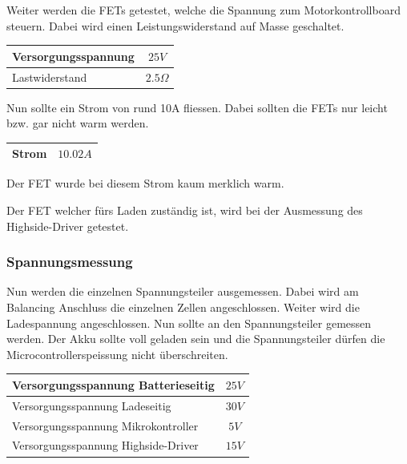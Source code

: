 Weiter werden die FETs getestet, welche die Spannung zum Motorkontrollboard steuern. Dabei wird einen Leistungswiderstand auf Masse geschaltet. 

\begin{center}
	\begin{tabular}{l|c}
		\hline 
		Versorgungsspannung & $25V$ \\ \hline
		Lastwiderstand & $2.5\Omega$ \\ \hline
	\end{tabular} 
	\label{tab:fetmessbedzumotorcontrol}
\end{center}

Nun sollte ein Strom von rund 10A fliessen. Dabei sollten die FETs nur leicht bzw. gar nicht warm werden.

\begin{center}
	\begin{tabular}{l|c}
		\hline 
		Strom & $10.02A$ \\ \hline
	\end{tabular} 
	\label{tab:StromMotorcontrollFET}
\end{center}

Der FET wurde bei diesem Strom kaum merklich warm.

Der FET welcher fürs Laden zuständig ist, wird bei der Ausmessung des Highside-Driver getestet.

\subsubsection*{Spannungsmessung}
Nun werden die einzelnen Spannungsteiler ausgemessen. Dabei wird am Balancing Anschluss die einzelnen Zellen angeschlossen. Weiter wird die Ladespannung angeschlossen. Nun sollte an den Spannungsteiler gemessen werden. Der Akku sollte voll geladen sein und die Spannungsteiler dürfen die Microcontrollerspeissung nicht überschreiten.

\begin{center}
	\begin{tabular}{l|c}
		\hline 
		Versorgungsspannung Batterieseitig & $25V$ \\ \hline
		Versorgungsspannung Ladeseitig & $30V$ \\ \hline
		Versorgungsspannung Mikrokontroller & $5V$ \\ \hline
		Versorgungsspannung Highside-Driver & $15V$ \\ \hline
		
	\end{tabular} 
	\label{tab:BedingungSpannungsmessungen}
\end{center}

